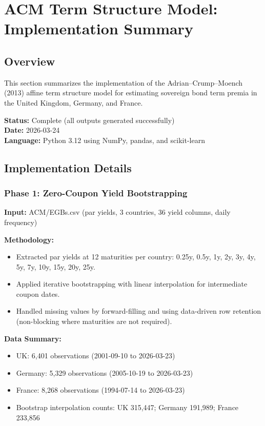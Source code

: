 \section{ACM Term Structure Model: Implementation Summary}

\subsection{Overview}
This section summarizes the implementation of the Adrian--Crump--Moench (2013) affine term structure model for estimating sovereign bond term premia in the United Kingdom, Germany, and France.

\textbf{Status:} Complete (all outputs generated successfully) \\
\textbf{Date:} 2026-03-24 \\
\textbf{Language:} Python 3.12 using NumPy, pandas, and scikit-learn

\subsection{Implementation Details}

\subsubsection{Phase 1: Zero-Coupon Yield Bootstrapping}
\textbf{Input:} ACM/EGBs.csv (par yields, 3 countries, 36 yield columns, daily frequency)

\textbf{Methodology:}
\begin{itemize}
  \item Extracted par yields at 12 maturities per country: 0.25y, 0.5y, 1y, 2y, 3y, 4y, 5y, 7y, 10y, 15y, 20y, 25y.
  \item Applied iterative bootstrapping with linear interpolation for intermediate coupon dates.
  \item Handled missing values by forward-filling and using data-driven row retention (non-blocking where maturities are not required).
\end{itemize}

\textbf{Data Summary:}
\begin{itemize}
  \item UK: 6,401 observations (2001-09-10 to 2026-03-23)
  \item Germany: 5,329 observations (2005-10-19 to 2026-03-23)
  \item France: 8,268 observations (1994-07-14 to 2026-03-23)
  \item Bootstrap interpolation counts: UK 315,447; Germany 191,989; France 233,856
\end{itemize}


